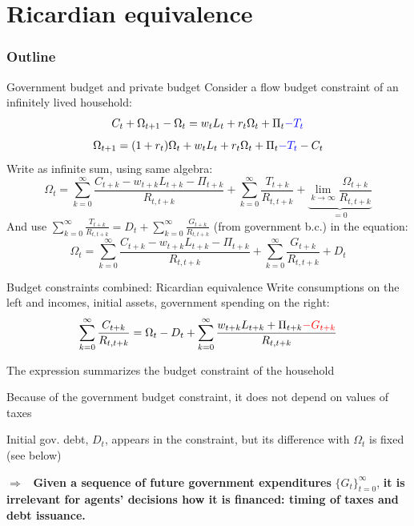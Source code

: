 \documentclass{beamer}
\newenvironment{mytemize}
{\vfill\itemize[nolistsep,itemsep=\fill,label=\color{blue}{$\triangleright$}]}
  {\enditemize}
\newcommand{\rarr}{$\Rightarrow$\ }
\begin{document}
\section{Ricardian equivalence}
\begin{frame}
\frametitle{Outline}
\tableofcontents[currentsection]
\end{frame}
\begin{frame}{Government budget and private budget}
Consider a flow budget constraint of an infinitely lived household:
$$ C_t + \Omega_{t+1} - \Omega_t = w_t L_t + r_t \Omega_t + \Pi_t \textcolor{blue}{- T_t}$$
$$ \Omega_{t+1} = (1+r_t) \Omega_t +  w_t L_t + r_t \Omega_t + \Pi_t \textcolor{blue}{- T_t}- C_t $$
Write as infinite sum, using same algebra:
$$\Omega_t = \sum_{k=0}^{\infty} \frac{C_{t+k} - w_{t+k} L_{t+k} - \Pi_{t+k}}{R_{t, t+k}} + \sum_{k=0}^{\infty} \frac{T_{t+k}}{R_{t, t+k}}+ \underbrace{\lim_{k\to\infty}\frac{\Omega_{t+k}}{R_{t, t+k}}}_{=0}$$
And use $\sum_{k=0}^{\infty} \frac{T_{t+k}}{R_{t, t+k}} = D_t + \sum_{k=0}^{\infty} \frac{G_{t+k}}{R_{t, t+k}}$ (from government b.c.) in the equation:  
$$\Omega_t = \sum_{k=0}^{\infty} \frac{C_{t+k} - w_{t+k} L_{t+k} - \Pi_{t+k}}{R_{t, t+k}} + \sum_{k=0}^{\infty} \frac{G_{t+k}}{R_{t, t+k}}+ D_{t}$$
\end{frame}

\begin{frame}{Budget constraints combined: Ricardian equivalence}
  Write consumptions on the left and incomes, initial assets, government spending on the right:
  $$\sum_{k=0}^{\infty} \frac{C_{t+k} }{R_{t, t+k}} = \Omega_t - D_t  + \sum_{k=0}^{\infty} \frac{ w_{t+k} L_{t+k} + \Pi_{t+k}\textcolor{red}{- G_{t+k}}}{R_{t, t+k}} $$
\begin{mytemize}
\item The expression summarizes the budget constraint of the household
\item Because of the government budget constraint, it does not depend on values of taxes 
\item Initial gov. debt, $D_t$, appears in the constraint, but its difference with $\Omega_t$ is fixed (see below)
\item[\rarr] \textbf{Given a sequence of future government expenditures} $\{G_t \}_{t=0}^\infty$, \textbf{it is irrelevant for agents' decisions how it is financed: timing of taxes and debt issuance.}
\end{mytemize}
\end{frame}
\end{document}
